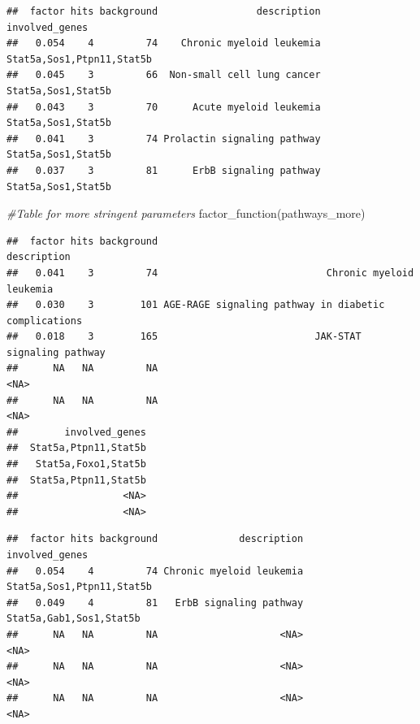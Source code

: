 \documentclass[
]{article}
\newenvironment{Shaded}{\begin{snugshade}}{\end{snugshade}}
\newcommand{\AttributeTok}[1]{\textcolor[rgb]{0.77,0.63,0.00}{#1}}
\newcommand{\CommentTok}[1]{\textcolor[rgb]{0.56,0.35,0.01}{\textit{#1}}}
\newcommand{\FunctionTok}[1]{\textcolor[rgb]{0.00,0.00,0.00}{#1}}
\newcommand{\NormalTok}[1]{#1}
\newcommand{\OtherTok}[1]{\textcolor[rgb]{0.56,0.35,0.01}{#1}}
\newcommand{\SpecialCharTok}[1]{\textcolor[rgb]{0.00,0.00,0.00}{#1}}
\newcommand{\StringTok}[1]{\textcolor[rgb]{0.31,0.60,0.02}{#1}}
\begin{document}
\begin{verbatim}
##  factor hits background                 description            involved_genes
##   0.054    4         74    Chronic myeloid leukemia Stat5a,Sos1,Ptpn11,Stat5b
##   0.045    3         66  Non-small cell lung cancer        Stat5a,Sos1,Stat5b
##   0.043    3         70      Acute myeloid leukemia        Stat5a,Sos1,Stat5b
##   0.041    3         74 Prolactin signaling pathway        Stat5a,Sos1,Stat5b
##   0.037    3         81      ErbB signaling pathway        Stat5a,Sos1,Stat5b
\end{verbatim}

\begin{Shaded}
\begin{Highlighting}[]
\CommentTok{\#Table for more stringent parameters}
\FunctionTok{factor\_function}\NormalTok{(pathways\_more)}
\end{Highlighting}
\end{Shaded}

\begin{verbatim}
##  factor hits background                                          description
##   0.041    3         74                             Chronic myeloid leukemia
##   0.030    3        101 AGE-RAGE signaling pathway in diabetic complications
##   0.018    3        165                           JAK-STAT signaling pathway
##      NA   NA         NA                                                 <NA>
##      NA   NA         NA                                                 <NA>
##        involved_genes
##  Stat5a,Ptpn11,Stat5b
##   Stat5a,Foxo1,Stat5b
##  Stat5a,Ptpn11,Stat5b
##                  <NA>
##                  <NA>
\end{verbatim}

\begin{Shaded}
\end{Shaded}

\begin{verbatim}
##  factor hits background              description            involved_genes
##   0.054    4         74 Chronic myeloid leukemia Stat5a,Sos1,Ptpn11,Stat5b
##   0.049    4         81   ErbB signaling pathway   Stat5a,Gab1,Sos1,Stat5b
##      NA   NA         NA                     <NA>                      <NA>
##      NA   NA         NA                     <NA>                      <NA>
##      NA   NA         NA                     <NA>                      <NA>
\end{verbatim}
\end{document}
